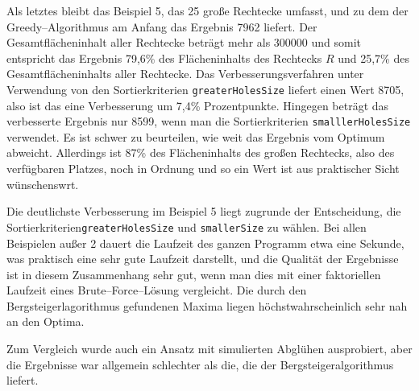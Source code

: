 Als letztes bleibt das Beispiel 5, das 25 große Rechtecke umfasst, und zu dem 
der Greedy--Algorithmus am Anfang das Ergebnis 7962 liefert. 
Der Gesamtflächeninhalt aller Rechtecke beträgt mehr als 300000 und somit
entspricht das Ergebnis 79,6\% des Flächeninhalts des Rechtecks $R$ und
25,7\% des Gesamtflächeninhalts aller Rechtecke.
Das Verbesserungsverfahren unter Verwendung von den Sortierkriterien \texttt{greaterHolesSize}
liefert einen Wert 8705, also ist das eine Verbesserung um 7,4\% Prozentpunkte.
Hingegen beträgt das verbesserte Ergebnis nur 8599, wenn man 
die Sortierkriterien \texttt{smalllerHolesSize} verwendet. 
Es ist schwer zu beurteilen, wie weit das Ergebnis vom Optimum abweicht. 
Allerdings ist 87\% des Flächeninhalts des großen Rechtecks, also des verfügbaren Platzes,
noch in Ordnung und so ein Wert ist aus praktischer Sicht wünschenswrt. 

Die deutlichste Verbesserung im Beispiel 5 liegt zugrunde der Entscheidung,
die Sortierkriterien\break \texttt{greaterHolesSize} und \texttt{smallerSize} zu wählen.
Bei allen Beispielen außer 2 dauert die Laufzeit des ganzen Programm etwa eine Sekunde,
was praktisch eine sehr gute Laufzeit darstellt, und die Qualität der Ergebnisse 
ist in diesem Zusammenhang sehr gut, wenn man dies mit einer faktoriellen Laufzeit 
eines Brute--Force--Lösung vergleicht. Die durch den Bergsteigerlagorithmus 
gefundenen Maxima liegen höchstwahrscheinlich sehr nah an den Optima.

Zum Vergleich wurde auch ein Ansatz mit simulierten Abglühen ausprobiert, aber
die Ergebnisse war allgemein schlechter als die, die der Bergsteigeralgorithmus liefert.